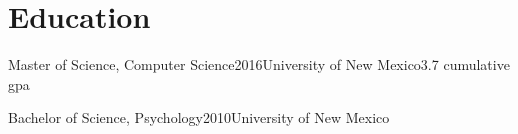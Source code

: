 \documentclass[print]{friggeri-cv} %
\begin{document}
  \iftoggle{cv}{
\begin{description}
  \item  {\largeheaderfont Student Volunteer } {\smallheaderfont \hfill 2008\textemdash 2010} \\*
    {\footnotesize \emph{The Mind Research Network, Albuquerque, NM}} \hfill \\*
    Assisted with a study ran by Pilar Sanjuan, PhD investigating substance use
    and post-traumatic stress disorder (PTSD) in recently returned combat
    veterans. \\*
\end{description}


\begin{description}
  \item  {\largeheaderfont Student Volunteer}  \hfill {\smallheaderfont 2008 } \\*
    {\footnotesize \emph{The University of New Mexico, Albuquerque, NM}\textemdash } \\*
    Assisted Akaysha Tang, PhD, with a study investigating stress regulation in
    rats and assisted an expert in troubleshooting and repairing an EEG system
    for a study investigating stress in humans.\\*
\end{description}
}{} %

\section{Education}
\begin{edu}{Master of Science, Computer Science}{2016}{University of New Mexico}{3.7 cumulative gpa}
\end{edu}
\begin{edu}{Bachelor of Science, Psychology}{2010}{University of New Mexico}{}
\end{edu}
\end{document}

